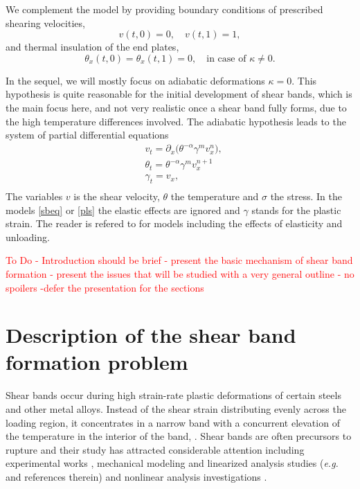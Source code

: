 \documentclass[a4paper,11pt]{article}
\newcommand{\del}{\partial}
\newcommand{\tcr}{\textcolor{red}}
\theoremstyle{remark}
\begin{document}
We complement the model by providing boundary conditions of prescribed shearing velocities,
\begin{equation} \label{BCOND1}
 v(t,0)=0, \quad v(t,1)=1, 
\end{equation}
and thermal insulation of the end plates,
\begin{equation} \label{BCOND2}
 \theta_x(t,0)=\theta_x(t,1)=0, \quad \text{in case of $\kappa\ne0$.}
\end{equation}



In the sequel, we will mostly focus on adiabatic deformations $\kappa = 0$. This hypothesis is quite reasonable for the initial development of shear bands,
which is the main focus here, and not very realistic once a shear band fully forms, due to the high temperature differences involved.
The adiabatic hypothesis leads to the system of partial differential equations
\begin{equation}
  \label{pls}
  \begin{aligned}
    & v_{t} = \del_x \Big ( \theta^{-\alpha}\gamma^{m}  v_{x}^n \Big )  ,\\
    & \theta_{t} =  \theta^{-\alpha}\gamma^{m} v_{x}^{n+1}   \\
    & \gamma_{t} = v_{x},  \\
  \end{aligned}
\end{equation}
The variables $v$ is the shear velocity, $\theta$ the temperature and $\sigma$ the stress.
In the models \eqref{sbeq} or \eqref{pls} the elastic effects are ignored and $\gamma$ stands for the plastic strain. The reader is refered to
\cite{SC89} for models including the effects of elasticity and unloading.


\tcr{To Do -  Introduction should be brief - present the basic mechanism of shear band formation - present the issues that 
will be studied with a very general outline - no spoilers -defer the presentation for the sections }


 
\vfil\eject

 
 \section{Description of the shear band formation problem}
\label{mathmodel}

Shear bands occur during
high strain-rate plastic deformations of certain steels and other metal alloys. Instead of the shear strain distributing evenly across the loading region, 
it concentrates in a narrow band with a concurrent elevation of the temperature in the interior of the band, \cite{ZH44,HDH87}.
Shear bands are often precursors to rupture and their study has attracted considerable
attention including  experimental works  \cite{CCHD79,HDH87}, mechanical modeling 
and  linearized analysis studies  ({\it e.g.} \cite{CDHS84,FM87,MC87,SC89,Wright02} and references therein) and
nonlinear analysis investigations  \cite{DH83,Tzavaras87,BPV91}.
\end{document}
